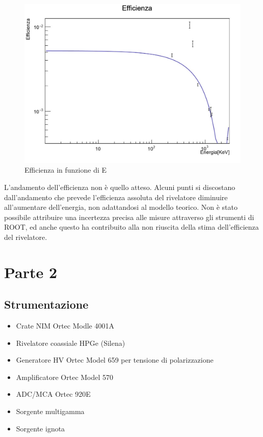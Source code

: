 \documentclass[a4paper,10pt]{article}
\begin{document}
\begin{figure}[H]
    \centering
    \includegraphics[scale=0.45]{grafici/efficienzasources}
    \caption{Efficienza in funzione di E}
\end{figure}

\noindent L'andamento dell'efficienza non \`e quello atteso. Alcuni punti si discostano dall'andamento che prevede l'efficienza assoluta del rivelatore diminuire all'aumentare dell'energia, non adattandosi al modello teorico. Non \`e stato possibile attribuire una incertezza precisa alle misure attraverso gli strumenti di ROOT, ed anche questo ha contribuito alla non riuscita della stima dell'efficienza del rivelatore.

\section{Parte 2}


\subsection{Strumentazione}
\begin{itemize}
\item Crate NIM Ortec Modle 4001A
\item Rivelatore coassiale HPGe (Silena)
\item Generatore HV Ortec Model 659 per tensione di polarizzazione
\item Amplificatore Ortec Model 570
\item ADC/MCA Ortec 920E
\item Sorgente multigamma
\item Sorgente ignota
\end{itemize}
\end{document}
